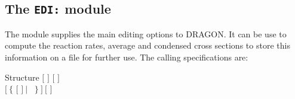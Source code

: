 \subsection{The {\tt EDI:} module}\label{sect:EDIData}

The  module supplies the main editing options to DRAGON. It can be
use to compute the reaction rates, average and condensed cross sections to store
this information on a file for further use. The calling specifications are:

\begin{DataStructure}{Structure }
 \moc{:=}  $[$  $]$
 $[$   $]$ \\
\hskip 0.5cm $[~\{$  $[$  $]~|$  ~$\}~]~[$  $]$ \moc{::} 
\end{DataStructure}

